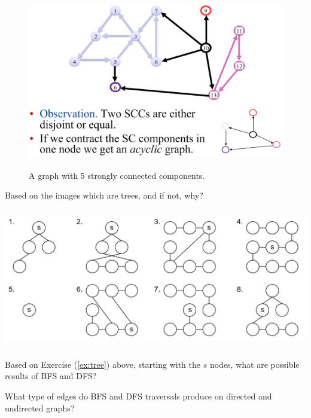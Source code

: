 \begin{figure}[h]
    \begin{center}
      \includegraphics[height=3in]{./Sections/graphs/dag/strong_conn.png}
    \end{center}
     \caption{A graph with 5 strongly connected components.}\label{fig:strong_conn}
\end{figure}

\newpage 

\begin{Exercise}Based on the images which are trees, and if not, why?

    \label{ex:tree}
    \vspace{1em}
    \hspace{-2em}
    \includegraphics[height=2.4in]{./Sections/graphs/dag/tree_example.png}

\end{Exercise}

\begin{Exercise} Based on Exercise (\ref{ex:tree}) above, starting with the $s$ nodes,
    what are possible results of BFS and DFS?
\end{Exercise}

\vspace{.5em}
\begin{Exercise} What type of edges do BFS and DFS traversals produce on directed and undirected graphs?
\end{Exercise}

